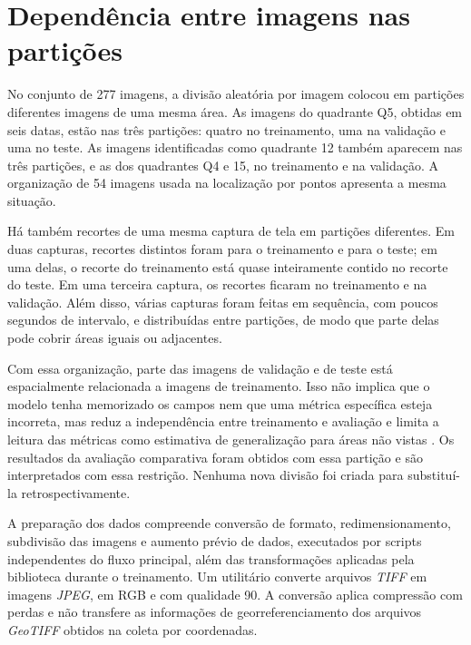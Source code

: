 \section{Depend\^encia entre imagens nas parti\c{c}\~oes}
\label{sec:dependencia-imagens-particoes}

No conjunto de 277 imagens, a divis\~ao aleat\'oria por imagem colocou em parti\c{c}\~oes diferentes imagens de uma mesma \'area. As imagens do quadrante Q5, obtidas em seis datas, est\~ao nas tr\^es parti\c{c}\~oes: quatro no treinamento, uma na valida\c{c}\~ao e uma no teste. As imagens identificadas como quadrante 12 tamb\'em aparecem nas tr\^es parti\c{c}\~oes, e as dos quadrantes Q4 e 15, no treinamento e na valida\c{c}\~ao. A organiza\c{c}\~ao de 54 imagens usada na localiza\c{c}\~ao por pontos apresenta a mesma situa\c{c}\~ao.

H\'a tamb\'em recortes de uma mesma captura de tela em parti\c{c}\~oes diferentes. Em duas capturas, recortes distintos foram para o treinamento e para o teste; em uma delas, o recorte do treinamento est\'a quase inteiramente contido no recorte do teste. Em uma terceira captura, os recortes ficaram no treinamento e na valida\c{c}\~ao. Al\'em disso, v\'arias capturas foram feitas em sequ\^encia, com poucos segundos de intervalo, e distribu\'idas entre parti\c{c}\~oes, de modo que parte delas pode cobrir \'areas iguais ou adjacentes.

Com essa organiza\c{c}\~ao, parte das imagens de valida\c{c}\~ao e de teste est\'a espacialmente relacionada a imagens de treinamento. Isso n\~ao implica que o modelo tenha memorizado os campos nem que uma m\'etrica espec\'ifica esteja incorreta, mas reduz a independ\^encia entre treinamento e avalia\c{c}\~ao e limita a leitura das m\'etricas como estimativa de generaliza\c{c}\~ao para \'areas n\~ao vistas \citep{kattenborn2022}. Os resultados da avalia\c{c}\~ao comparativa foram obtidos com essa parti\c{c}\~ao e s\~ao interpretados com essa restri\c{c}\~ao. Nenhuma nova divis\~ao foi criada para substitu\'i-la retrospectivamente.

A prepara\c{c}\~ao dos dados compreende convers\~ao de formato, redimensionamento, subdivis\~ao das imagens e aumento pr\'evio de dados, executados por scripts independentes do fluxo principal, al\'em das transforma\c{c}\~oes aplicadas pela biblioteca durante o treinamento. Um utilit\'ario converte arquivos \textit{TIFF} em imagens \textit{JPEG}, em RGB e com qualidade 90. A convers\~ao aplica compress\~ao com perdas e n\~ao transfere as informa\c{c}\~oes de georreferenciamento dos arquivos \textit{GeoTIFF} obtidos na coleta por coordenadas.

